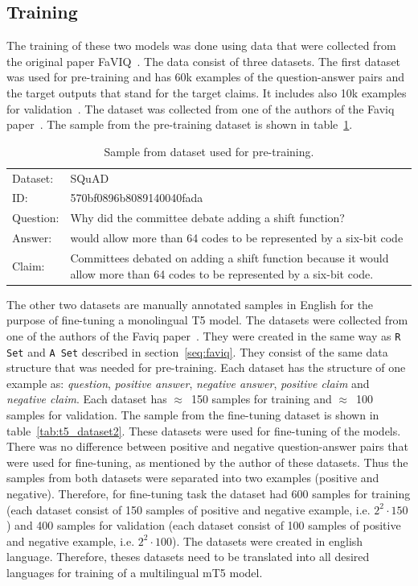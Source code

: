 \subsection*{Training}
The training of these two models was done using data that were collected from the original paper FaVIQ~\cite{faviq}. The data consist of three datasets. The first dataset was used for pre-training and has 60k examples of the question-answer pairs and the target outputs that stand for the target claims. It includes also 10k examples for validation~\cite{faviq}. The dataset was collected from one of the authors of the Faviq paper~\cite{faviq}. The sample from the pre-training dataset is shown in table~\ref{tab:t5_dataset}. 

\begin{table}[H]
    \centering
    \begin{tabular}{lp{8cm}}
        \hline
        Dataset: & SQuAD \\
        ID: & 570bf0896b8089140040fada \\
        Question: & Why did the committee debate adding a shift function? \\
        Answer: & would allow more than 64 codes to be represented by a six-bit code \\
        Claim: & Committees debated on adding a shift function because it would allow more than 64 codes to be represented by a six-bit code. \\
        \hline
    \end{tabular}
    \caption{Sample from dataset used for pre-training.}
    \label{tab:t5_dataset}
\end{table}

The other two datasets are manually annotated samples in English for the purpose of fine-tuning a monolingual T5 model. The datasets were collected from one of the authors of the Faviq paper~\cite{faviq}. They were created in the same way as \texttt{R Set} and \texttt{A Set} described in section~\ref{seq:faviq}. They consist of the same data structure that was needed for pre-training. Each dataset has the structure of one example as: \emph{question}, \emph{positive answer}, \emph{negative answer}, \emph{positive claim} and \emph{negative claim}. Each dataset has $\approx$~150 samples for training and $\approx$~100 samples for validation. The sample from the fine-tuning dataset is shown in table~\ref{tab:t5_dataset2}. These datasets were used for fine-tuning of the models. There was no difference between positive and negative question-answer pairs that were used for fine-tuning, as mentioned by the author of these datasets. Thus the samples from both datasets were separated into two examples (positive and negative). Therefore, for fine-tuning task the dataset had 600 samples for training (each dataset consist of 150 samples of positive and negative example, i.e. $2^2\cdot150$) and 400 samples for validation (each dataset consist of 100 samples of positive and negative example, i.e. $2^2\cdot100$). The datasets were created in english language. Therefore, theses datasets need to be translated into all desired languages for training of a multilingual mT5 model.

